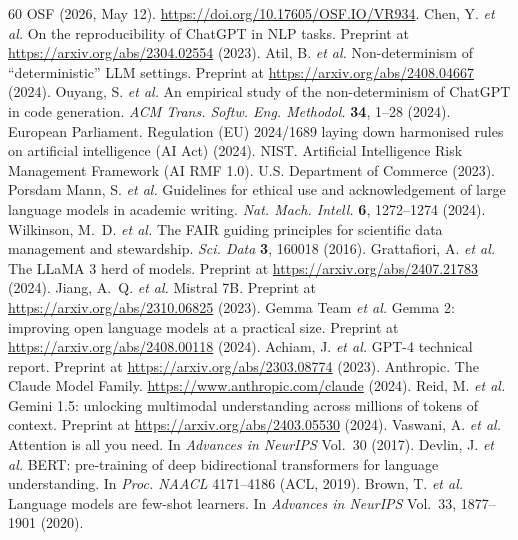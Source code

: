 \documentclass[sn-nature]{sn-jnl}
\begin{document}
\begin{thebibliography}{60}
OSF (2026, May 12). \url{https://doi.org/10.17605/OSF.IO/VR934}.
Chen, Y. \emph{et al.}
On the reproducibility of ChatGPT in NLP tasks.
Preprint at \url{https://arxiv.org/abs/2304.02554} (2023).
Atil, B. \emph{et al.}
Non-determinism of ``deterministic'' LLM settings.
Preprint at \url{https://arxiv.org/abs/2408.04667} (2024).
Ouyang, S. \emph{et al.}
An empirical study of the non-determinism of ChatGPT in code generation.
\emph{ACM Trans. Softw. Eng. Methodol.} \textbf{34}, 1--28 (2024).
European Parliament.
Regulation (EU) 2024/1689 laying down harmonised rules on artificial intelligence (AI Act) (2024).
NIST.
Artificial Intelligence Risk Management Framework (AI RMF 1.0).
U.S. Department of Commerce (2023).
Porsdam Mann, S. \emph{et al.}
Guidelines for ethical use and acknowledgement of large language models in academic writing.
\emph{Nat. Mach. Intell.} \textbf{6}, 1272--1274 (2024).
Wilkinson, M.~D. \emph{et al.}
The FAIR guiding principles for scientific data management and stewardship.
\emph{Sci. Data} \textbf{3}, 160018 (2016).
Grattafiori, A. \emph{et al.}
The LLaMA 3 herd of models.
Preprint at \url{https://arxiv.org/abs/2407.21783} (2024).
Jiang, A.~Q. \emph{et al.}
Mistral 7B.
Preprint at \url{https://arxiv.org/abs/2310.06825} (2023).
Gemma Team \emph{et al.}
Gemma 2: improving open language models at a practical size.
Preprint at \url{https://arxiv.org/abs/2408.00118} (2024).
Achiam, J. \emph{et al.}
GPT-4 technical report.
Preprint at \url{https://arxiv.org/abs/2303.08774} (2023).
Anthropic.
The Claude Model Family.
\url{https://www.anthropic.com/claude} (2024).
Reid, M. \emph{et al.}
Gemini 1.5: unlocking multimodal understanding across millions of tokens of context.
Preprint at \url{https://arxiv.org/abs/2403.05530} (2024).
Vaswani, A. \emph{et al.}
Attention is all you need.
In \emph{Advances in NeurIPS} Vol.~30 (2017).
Devlin, J. \emph{et al.}
BERT: pre-training of deep bidirectional transformers for language understanding.
In \emph{Proc. NAACL} 4171--4186 (ACL, 2019).
Brown, T. \emph{et al.}
Language models are few-shot learners.
In \emph{Advances in NeurIPS} Vol.~33, 1877--1901 (2020).

\end{thebibliography}
\end{document}
